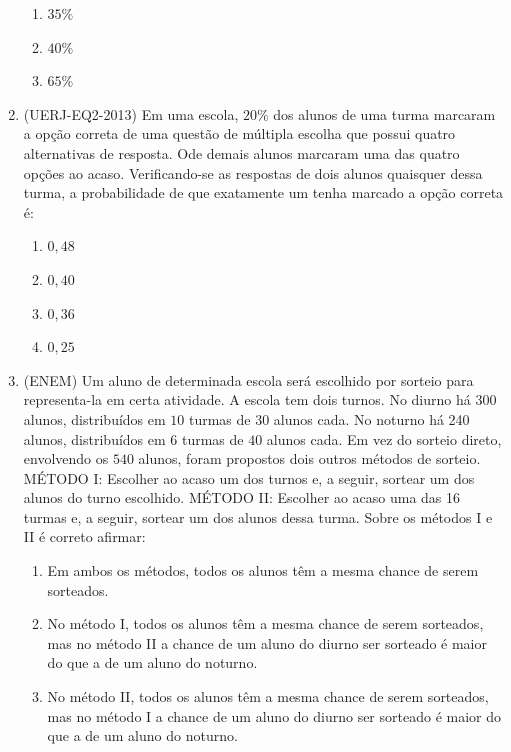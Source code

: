 \begin{enumerate}
\begin{enumerate}
\item {} 
$35\%$

\item {} 
$40\%$

\item {} 
$65\%$

\end{enumerate}

\item (UERJ-EQ2-2013) Em uma escola, $20\%$ dos alunos de uma turma marcaram a opção correta de uma questão de múltipla escolha que possui quatro alternativas de resposta. Ode demais alunos marcaram uma das quatro opções ao acaso. Verificando-se as respostas de dois alunos quaisquer dessa turma, a probabilidade de que exatamente um tenha marcado a opção correta é:
\begin{enumerate}
\item {} 
$0{,}48$

\item {} 
$0{,}40$

\item {} 
$0{,}36$

\item {} 
$0{,}25$

\end{enumerate}

\item (ENEM) Um aluno de determinada escola será escolhido por sorteio para representa-la em certa atividade. A escola tem dois turnos. No diurno há 300 alunos, distribuídos em $10$ turmas de $30$ alunos cada. No noturno há 240 alunos, distribuídos em $6$ turmas de $40$ alunos cada. Em vez do sorteio direto, envolvendo os $540$ alunos, foram propostos dois outros métodos de sorteio.
MÉTODO I: Escolher ao acaso um dos turnos e, a seguir, sortear um dos alunos do turno escolhido.
MÉTODO II: Escolher ao acaso uma das 16 turmas e, a seguir, sortear um dos alunos dessa turma.
Sobre os métodos I e II é correto afirmar:
\clearpage
\begin{enumerate}
\item {} 
Em ambos os métodos, todos os alunos têm a mesma chance de serem sorteados.

\item {} 
No método I, todos os alunos têm a mesma chance de serem sorteados, mas no método II a chance de um aluno do diurno ser sorteado é maior do que a de um aluno do noturno.

\item {} 
No método II, todos os alunos têm a mesma chance de serem sorteados, mas no método I a chance de um aluno do diurno ser sorteado é maior do que a de um aluno do noturno.


\end{enumerate}
\end{enumerate}
